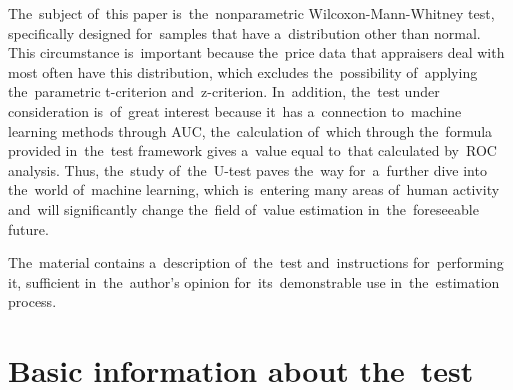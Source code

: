 \documentclass[]{scrreprt}
\begin{document}
The~subject of~this paper is~the~nonparametric Wilcoxon-Mann-Whitney test, specifically designed for~samples that have a~distribution other than normal. This circumstance is~important because the~price data that appraisers deal with most often have this distribution, which excludes the~possibility of~applying the~parametric t-criterion and~z-criterion. In~addition, the~test under consideration is~of~great interest because it~has a~connection to~machine learning methods through AUC, the~calculation of~which through the~formula provided in~the~test framework gives a~value equal to~that calculated by~ROC analysis. Thus, the~study of~the~U-test paves the~way for~a~further dive into the~world of~machine learning, which is~entering many areas of~human activity and~will significantly change the~field of~value estimation in~the~foreseeable future.

The~material contains a~description of~the~test and~instructions for~performing it, sufficient in~the~author's opinion for~its~demonstrable use in~the~estimation process.
%
\chapter{Basic information about the~test}
\end{document}
